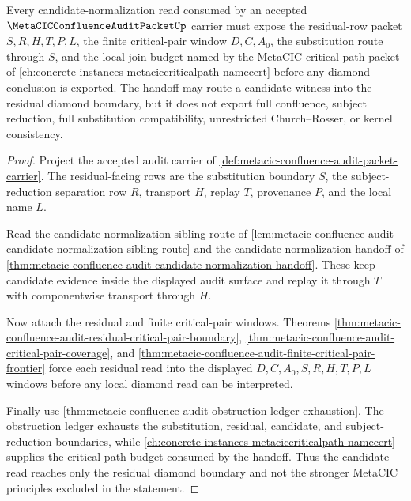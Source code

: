 \begin{theorem}
\label{thm:metacic-confluence-candidate-residual-diamond-handoff}
Every candidate-normalization read consumed by an accepted $\MetaCICConfluenceAuditPacketUp$ carrier must expose the residual-row packet $S,R,H,T,P,L$, the finite critical-pair window $D,C,A_0$, the substitution route through $S$, and the local join budget named by the MetaCIC critical-path packet of \autoref{ch:concrete-instances-metaciccriticalpath-namecert} before any diamond conclusion is exported. The handoff may route a candidate witness into the residual diamond boundary, but it does not export full confluence, subject reduction, full substitution compatibility, unrestricted Church--Rosser, or kernel consistency.
\end{theorem}
\begin{proof}
Project the accepted audit carrier of \autoref{def:metacic-confluence-audit-packet-carrier}. The residual-facing rows are the substitution boundary $S$, the subject-reduction separation row $R$, transport $H$, replay $T$, provenance $P$, and the local name $L$.

Read the candidate-normalization sibling route of \autoref{lem:metacic-confluence-audit-candidate-normalization-sibling-route} and the candidate-normalization handoff of \autoref{thm:metacic-confluence-audit-candidate-normalization-handoff}. These keep candidate evidence inside the displayed audit surface and replay it through $T$ with componentwise transport through $H$.

Now attach the residual and finite critical-pair windows. Theorems \autoref{thm:metacic-confluence-audit-residual-critical-pair-boundary}, \autoref{thm:metacic-confluence-audit-critical-pair-coverage}, and \autoref{thm:metacic-confluence-audit-finite-critical-pair-frontier} force each residual read into the displayed $D,C,A_0,S,R,H,T,P,L$ windows before any local diamond read can be interpreted.

Finally use \autoref{thm:metacic-confluence-audit-obstruction-ledger-exhaustion}. The obstruction ledger exhausts the substitution, residual, candidate, and subject-reduction boundaries, while \autoref{ch:concrete-instances-metaciccriticalpath-namecert} supplies the critical-path budget consumed by the handoff. Thus the candidate read reaches only the residual diamond boundary and not the stronger MetaCIC principles excluded in the statement.
\end{proof}
